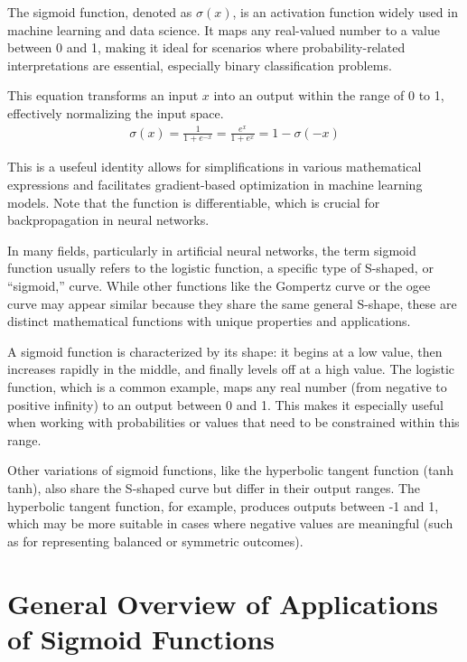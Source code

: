 \documentclass[
  12 pt,
  a4paper,
]{book}
\numberwithin{equation}{section}
\theoremstyle{plain}      %
\theoremstyle{definition} %
\theoremstyle{remark}     %
\theoremstyle{note}         %
\begin{document}
The sigmoid function, denoted as \(\sigma(x)\), is an activation
function widely used in machine learning and data science. It maps any
real-valued number to a value between 0 and 1, making it ideal for
scenarios where probability-related interpretations are essential,
especially binary classification problems.

This equation transforms an input \(x\) into an output within the range
of 0 to 1, effectively normalizing the input space. \begin{align}
\sigma(x) = \frac{1}{1 + e^{-x}} = \frac{e^x}{1 + e^x} = 1 - \sigma(-x)
\end{align}

This is a usefeul identity allows for simplifications in various
mathematical expressions and facilitates gradient-based optimization in
machine learning models. Note that the function is differentiable, which
is crucial for backpropagation in neural networks.

In many fields, particularly in artificial neural networks, the term
sigmoid function usually refers to the logistic function, a specific
type of S-shaped, or ``sigmoid,'' curve. While other functions like the
Gompertz curve or the ogee curve may appear similar because they share
the same general S-shape, these are distinct mathematical functions with
unique properties and applications.

A sigmoid function is characterized by its shape: it begins at a low
value, then increases rapidly in the middle, and finally levels off at a
high value. The logistic function, which is a common example, maps any
real number (from negative to positive infinity) to an output between 0
and 1. This makes it especially useful when working with probabilities
or values that need to be constrained within this range.

Other variations of sigmoid functions, like the hyperbolic tangent
function (tanh ⁡ tanh), also share the S-shaped curve but differ in their
output ranges. The hyperbolic tangent function, for example, produces
outputs between -1 and 1, which may be more suitable in cases where
negative values are meaningful (such as for representing balanced or
symmetric outcomes).

\hypertarget{general-overview-of-applications-of-sigmoid-functions}{%
\section{General Overview of Applications of Sigmoid
Functions}\label{general-overview-of-applications-of-sigmoid-functions}}
\end{document}

